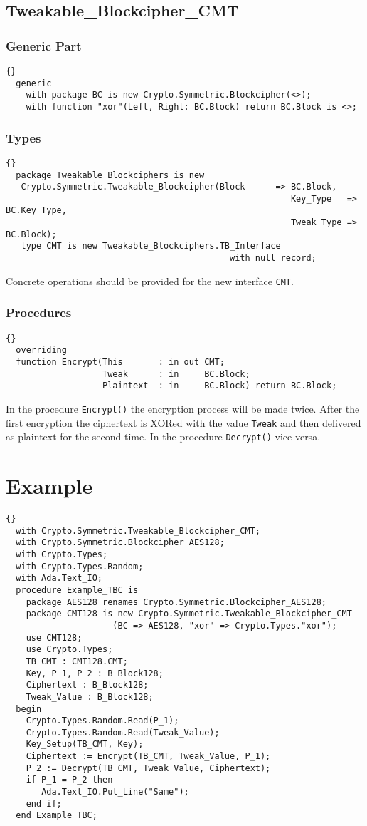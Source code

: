 \subsection*{Tweakable\_Blockcipher\_CMT}
\subsubsection*{Generic Part}
\begin{lstlisting}{}
  generic
    with package BC is new Crypto.Symmetric.Blockcipher(<>);
    with function "xor"(Left, Right: BC.Block) return BC.Block is <>;
\end{lstlisting}
\subsubsection*{Types}
\begin{lstlisting}{}
  package Tweakable_Blockciphers is new
   Crypto.Symmetric.Tweakable_Blockcipher(Block      => BC.Block,
														Key_Type   => BC.Key_Type,
														Tweak_Type => BC.Block);
   type CMT is new Tweakable_Blockciphers.TB_Interface 
   											with null record;
\end{lstlisting}
Concrete operations should be provided for the new interface \texttt{CMT}.
\subsubsection*{Procedures}
\begin{lstlisting}{}
  overriding
  function Encrypt(This       : in out CMT;
                   Tweak      : in     BC.Block;
                   Plaintext  : in     BC.Block) return BC.Block;
\end{lstlisting}
In the procedure \texttt{Encrypt()} the encryption process will be made twice. After the first encryption the ciphertext is XORed with the value \texttt{Tweak} and then delivered as plaintext for the second time. In the procedure \texttt{Decrypt()} vice versa.\\
\section{Example}
\begin{lstlisting}{}
  with Crypto.Symmetric.Tweakable_Blockcipher_CMT;
  with Crypto.Symmetric.Blockcipher_AES128;
  with Crypto.Types;
  with Crypto.Types.Random;
  with Ada.Text_IO;
  procedure Example_TBC is
    package AES128 renames Crypto.Symmetric.Blockcipher_AES128;
    package CMT128 is new Crypto.Symmetric.Tweakable_Blockcipher_CMT
   					 (BC => AES128, "xor" => Crypto.Types."xor");
    use CMT128;
    use Crypto.Types;
    TB_CMT : CMT128.CMT;
    Key, P_1, P_2 : B_Block128;
    Ciphertext : B_Block128;
    Tweak_Value : B_Block128;
  begin
    Crypto.Types.Random.Read(P_1);
    Crypto.Types.Random.Read(Tweak_Value);
    Key_Setup(TB_CMT, Key);
    Ciphertext := Encrypt(TB_CMT, Tweak_Value, P_1);
    P_2 := Decrypt(TB_CMT, Tweak_Value, Ciphertext);
    if P_1 = P_2 then
       Ada.Text_IO.Put_Line("Same");
    end if;
  end Example_TBC;
\end{lstlisting}